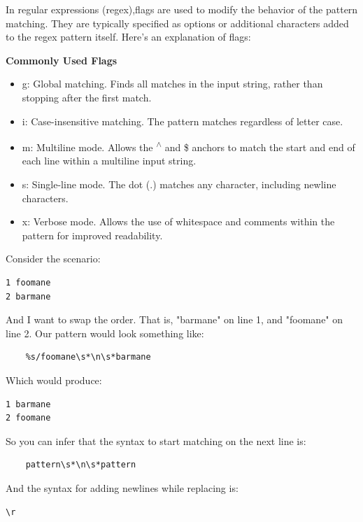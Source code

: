 \documentclass{report}
\begin{document}
    \bigbreak \noindent 
    In regular expressions (regex),flags are used to modify the behavior of the pattern matching. They are typically specified as options or additional characters added to the regex pattern itself. Here's an explanation of flags:

    \bigbreak \noindent 
    \textbf{Commonly Used Flags}
    \begin{itemize}
        \item g: Global matching. Finds all matches in the input string, rather than stopping after the first match.
        \item i: Case-insensitive matching. The pattern matches regardless of letter case.
        \item m: Multiline mode. Allows the \textsuperscript{$\wedge$} and \$ anchors to match the start and end of each line within a multiline input string.
        \item s: Single-line mode. The dot (.) matches any character, including newline characters.
        \item x: Verbose mode. Allows the use of whitespace and comments within the pattern for improved readability.
    \end{itemize}

    \bigbreak \noindent 
    

    \pagebreak \bigbreak \noindent
    \bigbreak \noindent 
    Consider the scenario:
    \begin{verbatim}
1 foomane
2 barmane
    \end{verbatim}
    \bigbreak \noindent 
    And I want to swap the order. That is, "barmane" on line 1, and "foomane" on line 2. Our pattern would look something like:
    \begin{verbatim}
    %s/foomane\s*\n\s*barmane
    \end{verbatim}
    \bigbreak \noindent 
    Which would produce:
    \begin{verbatim}
1 barmane
2 foomane
    \end{verbatim}
    So you can infer that the syntax to start matching on the next line is:
    \begin{verbatim}
    pattern\s*\n\s*pattern
    \end{verbatim}
    And the syntax for adding newlines while replacing is:
    \begin{verbatim}
\r
    \end{verbatim}




    
\end{document}

